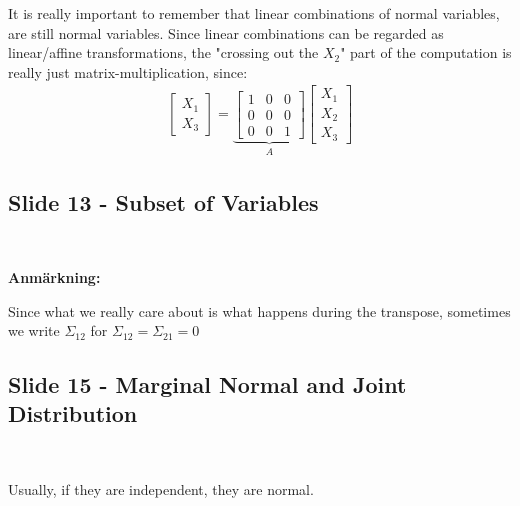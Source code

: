 \par\bigskip
\noindent It is really important to remember that linear combinations of normal variables, are still normal variables. Since linear combinations can be regarded as linear/affine transformations, the "crossing out the $X_2$" part of the computation is really just matrix-multiplication, since:
\begin{equation*}
  \begin{gathered}
    \begin{bmatrix}X_1\\X_3\end{bmatrix} = \underbrace{\begin{bmatrix}1&0&0\\0&0&0\\0&0&1\end{bmatrix}}_{\text{$A$}}\begin{bmatrix}X_1\\X_2\\X_3\end{bmatrix}
  \end{gathered}
\end{equation*}
\par\bigskip
\subsection{Slide 13 - Subset of Variables}\hfill\\
\par\bigskip
\noindent\textbf{Anmärkning:}\par
\noindent Since what we really care about is what happens during the transpose, sometimes we write $\Sigma_{12}$ for $\Sigma_{12} = \Sigma_{21} = 0$ 
\par\bigskip
\subsection{Slide 15 - Marginal Normal and Joint Distribution}\hfill\\
\par\bigskip
\noindent Usually, if they are independent, they are normal.
\par\bigskip
